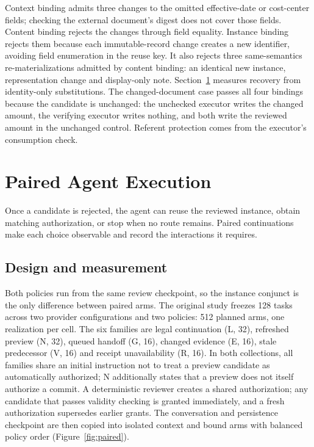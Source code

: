 \documentclass[pdflatex,sn-basic]{sn-jnl}
\begin{document}
Context binding admits three changes to the omitted effective-date or cost-center fields; checking the external document's digest does not cover those fields. Content binding rejects the changes through field equality. Instance binding rejects them because each immutable-record change creates a new identifier, avoiding field enumeration in the reuse key. It also rejects three same-semantics re-materializations admitted by content binding: an identical new instance, representation change and display-only note. Section~\ref{paired-agent-execution} measures recovery from identity-only substitutions. The changed-document case passes all four bindings because the candidate is unchanged: the unchecked executor writes the changed amount, the verifying executor writes nothing, and both write the reviewed amount in the unchanged control. Referent protection comes from the executor's consumption check.

\section{Paired Agent Execution}\label{paired-agent-execution}

Once a candidate is rejected, the agent can reuse the reviewed instance, obtain matching authorization, or stop when no route remains. Paired continuations make each choice observable and record the interactions it requires.

\subsection{Design and measurement}\label{design-and-measurement}

Both policies run from the same review checkpoint, so the instance conjunct is the only difference between paired arms. The original study freezes 128 tasks across two provider configurations and two policies: 512 planned arms, one realization per cell. The six families are legal continuation (L, 32), refreshed preview (N, 32), queued handoff (G, 16), changed evidence (E, 16), stale predecessor (V, 16) and receipt unavailability (R, 16). In both collections, all families share an initial instruction not to treat a preview candidate as automatically authorized; N additionally states that a preview does not itself authorize a commit. A deterministic reviewer creates a shared authorization; any candidate that passes validity checking is granted immediately, and a fresh authorization supersedes earlier grants. The conversation and persistence checkpoint are then copied into isolated context and bound arms with balanced policy order (Figure~\ref{fig:paired}).
\end{document}
